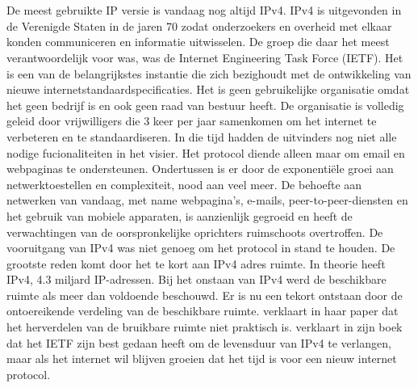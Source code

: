 \chapter{}%
\label{ch:stand-van-zaken}


\section{}%
\label{sec:Wat is er verkeerd met IPv4?}


 De meest gebruikte IP versie is vandaag nog altijd IPv4. \autocite{hagen2006ipv6} IPv4 is uitgevonden in de Verenigde Staten in de jaren 70 zodat onderzoekers en overheid met elkaar konden communiceren en informatie uitwisselen. De groep die daar het meest verantwoordelijk voor was, was de Internet Engineering Task Force (IETF).  Het is een van de belangrijkstes instantie die zich bezighoudt met de ontwikkeling van nieuwe internetstandaardspecificaties. Het is geen gebruikelijke organisatie omdat het geen bedrijf is en ook geen raad van bestuur heeft. \autocite{hoffman2006tao} De organisatie is volledig geleid door vrijwilligers die 3 keer per jaar samenkomen om het internet te verbeteren en te standaardiseren. In die tijd hadden de uitvinders nog niet alle nodige fucionaliteiten in het visier. Het protocol diende alleen maar om email en webpaginas te ondersteunen. Ondertussen is er door de exponentiële groei aan netwerktoestellen en complexiteit, nood aan veel meer. De behoefte aan netwerken van vandaag, met name webpagina's, e-mails, peer-to-peer-diensten en het gebruik van mobiele apparaten, is aanzienlijk gegroeid en heeft de verwachtingen van de oorspronkelijke oprichters ruimschoots overtroffen. \autocite{frankel2010guidelines} De vooruitgang van IPv4 was niet genoeg om het protocol in stand te houden. De grootste reden komt door het te kort aan IPv4 adres ruimte. In theorie heeft IPv4, 4.3 miljard IP-adressen. Bij het onstaan van IPv4 werd de beschikbare ruimte als meer dan voldoende beschouwd. Er is nu een tekort ontstaan door de ontoereikende verdeling van de beschikbare ruimte. \textcite{hagen2006ipv6} verklaart in haar paper dat het herverdelen van de bruikbare ruimte niet praktisch is.  \textcite{loshin2004ipv6} verklaart in zijn boek dat het IETF zijn best gedaan heeft om de levensduur van IPv4 te verlangen, maar als het internet wil blijven groeien dat het tijd is voor een nieuw internet protocol.


